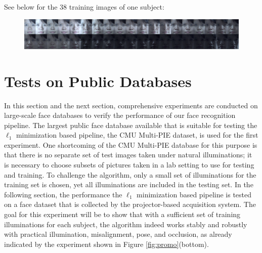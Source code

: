 See below for the 38 training images of one subject:
\begin{figure}[h]
\centering
\includegraphics[width=\textwidth]{figures_pami/training.png}
\end{figure}

\section{Tests on Public Databases}\label{sec:multipie} In this section and the
next section, comprehensive experiments are conducted on large-scale face
databases to verify the performance of our face recognition pipeline.  The
largest public face database available that is suitable for testing the
$\ell_1$ minimization based pipeline, the CMU Multi-PIE dataset, is used for
the first experiment.  One shortcoming of the CMU Multi-PIE database for this
purpose is that there is no separate set of test images taken under natural
illuminations; it is necessary to choose subsets of pictures taken in a lab
setting to use for testing and training.  To challenge the algorithm, only a
small set of illuminations for the training set is chosen, yet all
illuminations are included in the testing set. In the following section, the
performance the $\ell_1$ minimization based pipeline is tested on a face
dataset that is collected by the projector-based acquisition system. The goal
for this experiment will be to show that with a sufficient set of training
illuminations for each subject, the algorithm indeed works stably and robustly
with practical illumination, misalignment, pose, and occlusion, as already
indicated by the experiment shown in Figure \ref{fig:promo}(bottom).

